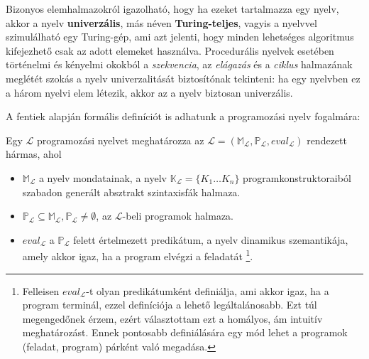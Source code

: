 Bizonyos elemhalmazokról igazolható, hogy ha ezeket tartalmazza egy nyelv, akkor a nyelv \textbf{univerzális}, más néven \textbf{Turing-teljes}, vagyis a nyelvvel szimulálható egy Turing-gép, ami azt jelenti, hogy minden lehetséges algoritmus kifejezhető csak az adott elemeket használva.
Procedurális nyelvek esetében történelmi és kényelmi okokból a \textit{szekvencia}, az \textit{elágazás} és a \textit{ciklus} halmazának meglétét szokás a nyelv univerzalitását biztosítónak tekinteni: ha egy nyelvben ez a három nyelvi elem létezik, akkor az a nyelv biztosan univerzális\cite{Fothi}.

\bigskip

\noindent A fentiek alapján formális definíciót is adhatunk a programozási nyelv fogalmára:
\begin{defn}
	Egy $\mathcal{L}$ programozási nyelvet meghatározza az $\mathcal{L} = (
		\mathbb{M}_\mathcal{L},
		\mathbb{P}_\mathcal{L},
		eval_\mathcal{L}
	)$ rendezett hármas, ahol
	\begin{itemize}
		\item $\mathbb{M}_\mathcal{L}$ a nyelv mondatainak, a nyelv $\mathbb{K}_\mathcal{L} = \{K_1 \ldots K_n\}$ programkonstruktoraiból szabadon generált absztrakt szintaxisfák halmaza.
		\item $\mathbb{P}_\mathcal{L} \subseteq \mathbb{M}_\mathcal{L}, \mathbb{P}_\mathcal{L} \not= \emptyset$, az $\mathcal{L}$-beli programok halmaza.
		\item $eval_{\mathcal{L}}$ a $\mathbb{P}_\mathcal{L}$ felett értelmezett predikátum, a nyelv dinamikus szemantikája, amely akkor igaz, ha a program elvégzi a feladatát%
		\footnote{
Felleisen $eval_\mathcal{L}$-t olyan predikátumként definiálja, ami akkor igaz, ha a program terminál\cite{Felleisen90}, ezzel  definíciója a lehető legáltalánosabb. Ezt túl megengedőnek érzem, ezért választottam ezt a homályos, ám intuitív meghatározást. Ennek pontosabb definiálására egy mód lehet a programok (feladat, program) párként való megadása.
		}.
	\end{itemize}
\end{defn}

